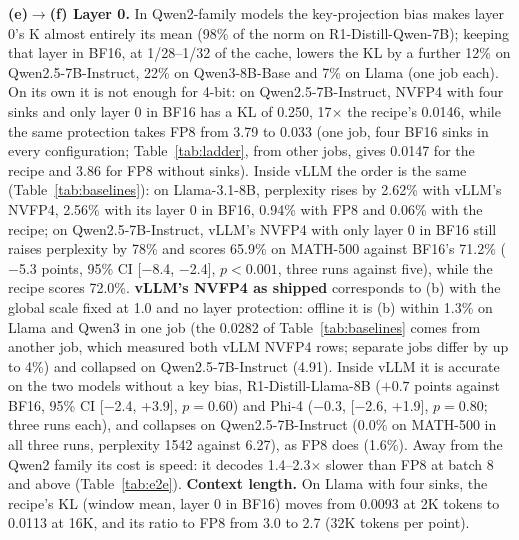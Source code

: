 \textbf{(e)$\to$(f) Layer 0.} In Qwen2-family models the key-projection bias makes layer 0's K almost entirely its
mean (98\% of the norm on R1-Distill-Qwen-7B); keeping that layer in BF16, at 1/28--1/32 of the cache, lowers the
KL by a further 12\% on Qwen2.5-7B-Instruct, 22\% on Qwen3-8B-Base and 7\% on Llama (one job each).
On its own it is not enough for 4-bit: on Qwen2.5-7B-Instruct, NVFP4 with four sinks and only layer 0 in BF16 has a
KL of 0.250, 17$\times$ the recipe's 0.0146, while the same protection takes FP8 from 3.79 to 0.033 (one job, four BF16 sinks in every configuration; Table~\ref{tab:ladder}, from other jobs, gives 0.0147 for the recipe and 3.86 for FP8 without sinks).
Inside vLLM the order is the same (Table~\ref{tab:baselines}): on Llama-3.1-8B, perplexity rises by 2.62\% with vLLM's NVFP4, 2.56\% with its layer 0 in BF16, 0.94\% with FP8 and 0.06\% with the recipe; on Qwen2.5-7B-Instruct, vLLM's NVFP4 with only layer 0 in BF16 still raises perplexity by 78\% and scores 65.9\% on MATH-500 against BF16's 71.2\% ($-$5.3 points, 95\% CI [$-$8.4, $-$2.4], $p < 0.001$, three runs against five), while the recipe scores 72.0\%.
\textbf{vLLM's NVFP4 as shipped} corresponds to (b) with the global scale fixed at 1.0 and no layer protection:
offline it is (b) within 1.3\% on Llama and Qwen3 in one job (the 0.0282 of Table~\ref{tab:baselines} comes from another job, which measured both vLLM NVFP4 rows; separate jobs differ by up to 4\%) and collapsed on Qwen2.5-7B-Instruct (4.91).
Inside vLLM it is accurate on the two models without a key bias, R1-Distill-Llama-8B ($+0.7$ points against BF16, 95\% CI [$-$2.4, +3.9], $p = 0.60$) and Phi-4 ($-$0.3, [$-$2.6, +1.9], $p = 0.80$; three runs each), and collapses on Qwen2.5-7B-Instruct (0.0\% on MATH-500 in all three runs, perplexity 1542 against 6.27), as FP8 does (1.6\%). Away from the Qwen2 family its cost is speed: it decodes 1.4--2.3$\times$ slower than FP8 at batch 8 and above (Table~\ref{tab:e2e}).
\textbf{Context length.} On Llama with four sinks, the recipe's KL (window mean, layer 0 in BF16) moves from
0.0093 at 2K tokens to 0.0113 at 16K, and its ratio to FP8 from 3.0 to 2.7 (32K tokens per point).
